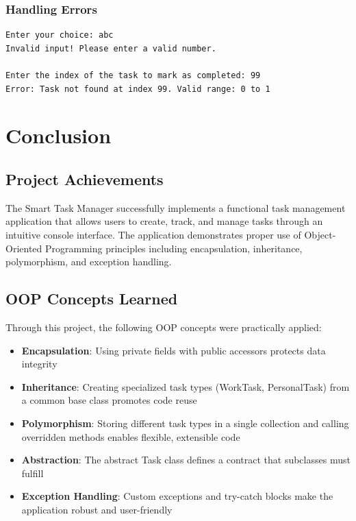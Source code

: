 \documentclass[12pt,a4paper]{article}
\begin{document}
\subsubsection{Handling Errors}

\begin{minipage}{\linewidth}
\begin{verbatim}
Enter your choice: abc
Invalid input! Please enter a valid number.

Enter the index of the task to mark as completed: 99
Error: Task not found at index 99. Valid range: 0 to 1
\end{verbatim}
\end{minipage}

\section{Conclusion}

\subsection{Project Achievements}

The Smart Task Manager successfully implements a functional task management application that allows users to create, track, and manage tasks through an intuitive console interface. The application demonstrates proper use of Object-Oriented Programming principles including encapsulation, inheritance, polymorphism, and exception handling.

\subsection{OOP Concepts Learned}

Through this project, the following OOP concepts were practically applied:

\begin{itemize}
    \item \textbf{Encapsulation}: Using private fields with public accessors protects data integrity
    \item \textbf{Inheritance}: Creating specialized task types (WorkTask, PersonalTask) from a common base class promotes code reuse
    \item \textbf{Polymorphism}: Storing different task types in a single collection and calling overridden methods enables flexible, extensible code
    \item \textbf{Abstraction}: The abstract Task class defines a contract that subclasses must fulfill
    \item \textbf{Exception Handling}: Custom exceptions and try-catch blocks make the application robust and user-friendly
\end{itemize}
\end{document}
